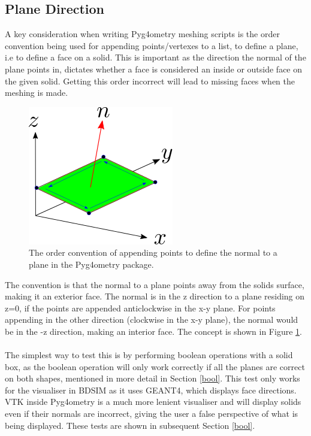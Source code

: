 \documentclass[12pt,a4paper]{article}
\begin{document}
\subsection{Plane Direction}
\label{order}
A key consideration when writing Pyg4ometry meshing scripts is the order convention being used for appending points/vertexes to a list, to define a plane, i.e to define a face on a solid. This is important as the direction the normal of the plane points in, dictates whether a face is considered an inside or outside face on the given solid. Getting this order incorrect will lead to missing faces when the meshing is made.
\begin{figure}[h!]
\centering
\includegraphics[scale=0.7]{Images//append_points//Point_Appending_Order.png}
\caption[width=\columnwidth]{The order convention of appending points to define the normal to a plane in the Pyg4ometry package.}
\label{pointsorder}
\end{figure}
\noindent The convention is that the normal to a plane points away from the solids surface, making it an exterior face. The normal is in the z direction to a plane residing on z=0, if the points are appended anticlockwise in the x-y plane. For points appending in the other direction (clockwise in the x-y plane), the normal would be in the -z direction, making an interior face. The concept is shown in Figure \ref{pointsorder}.
\\\\
The simplest way to test this is by performing boolean operations with a solid box, as the boolean operation will only work correctly if all the planes are correct on both shapes, mentioned in more detail in Section \ref{bool}. This test only works for the visualiser in BDSIM as it uses GEANT4, which displays face directions. VTK inside Pyg4ometry is a much more lenient visualiser and will display solids even if their normals are incorrect, giving the user a false perspective of what is being displayed. These tests are shown in subsequent Section \ref{bool}.
\end{document}

